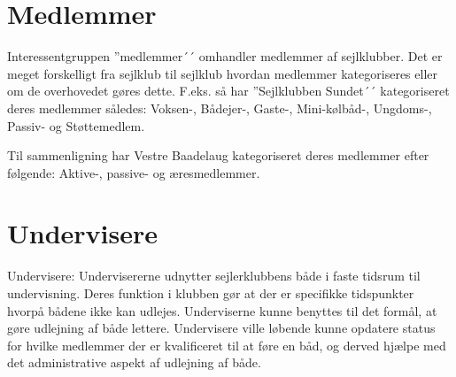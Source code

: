 \section{Medlemmer}

Interessentgruppen ''medlemmer´´ omhandler medlemmer af sejlklubber. Det er meget forskelligt fra sejlklub til
sejlklub hvordan medlemmer kategoriseres eller om de overhovedet gøres dette. F.eks. så har ''Sejlklubben
Sundet´´ kategoriseret deres medlemmer således: Voksen-, Bådejer-, Gaste-, Mini-kølbåd-, Ungdoms-, Passiv- og
Støttemedlem.

Til sammenligning har Vestre Baadelaug kategoriseret deres medlemmer efter følgende: Aktive-, passive- og
æresmedlemmer.




\section{Undervisere}

Undervisere: Undervisererne udnytter sejlerklubbens både i faste tidsrum til undervisning. Deres funktion i
klubben gør at der er specifikke tidspunkter hvorpå bådene ikke kan udlejes. Underviserne kunne benyttes til
det formål, at gøre udlejning af både lettere. Undervisere ville løbende kunne opdatere status for hvilke
medlemmer der er kvalificeret til at føre en båd, og derved hjælpe med det administrative aspekt af udlejning
af både.

\cbend
